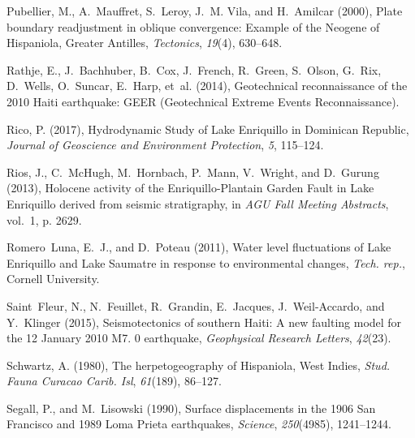 \documentclass[linenumbers,draft]{agujournal}
\begin{document}
\begin{thebibliography}{65}
Pubellier, M., A.~Mauffret, S.~Leroy, J.~M. Vila, and H.~Amilcar (2000), Plate
  boundary readjustment in oblique convergence: {Example of the Neogene of
  Hispaniola, Greater Antilles}, \textit{Tectonics}, \textit{19}(4), 630--648.

Rathje, E., J.~Bachhuber, B.~Cox, J.~French, R.~Green, S.~Olson, G.~Rix,
  D.~Wells, O.~Suncar, E.~Harp, et~al. (2014), {Geotechnical reconnaissance of
  the 2010 Haiti earthquake: GEER (Geotechnical Extreme Events
  Reconnaissance)}.

Rico, P. (2017), {Hydrodynamic Study of Lake Enriquillo in Dominican Republic},
  \textit{Journal of Geoscience and Environment Protection}, \textit{5},
  115--124.

Rios, J., C.~McHugh, M.~Hornbach, P.~Mann, V.~Wright, and D.~Gurung (2013),
  Holocene activity of the {Enriquillo-Plantain Garden Fault in Lake
  Enriquillo} derived from seismic stratigraphy, in \textit{AGU Fall Meeting
  Abstracts}, vol.~1, p. 2629.

Romero~Luna, E.~J., and D.~Poteau (2011), {Water level fluctuations of Lake
  Enriquillo and Lake Saumatre in response to environmental changes},
  \textit{Tech. rep.}, Cornell University.

Saint~Fleur, N., N.~Feuillet, R.~Grandin, E.~Jacques, J.~Weil-Accardo, and
  Y.~Klinger (2015), {Seismotectonics of southern Haiti: A new faulting model
  for the 12 January 2010 M7. 0 earthquake}, \textit{Geophysical Research
  Letters}, \textit{42}(23).

Schwartz, A. (1980), {The herpetogeography of Hispaniola, West Indies},
  \textit{Stud. Fauna Curacao Carib. Isl}, \textit{61}(189), 86--127.

Segall, P., and M.~Lisowski (1990), {Surface displacements in the 1906 San
  Francisco and 1989 Loma Prieta earthquakes}, \textit{Science},
  \textit{250}(4985), 1241--1244.


\end{thebibliography}
\end{document}
